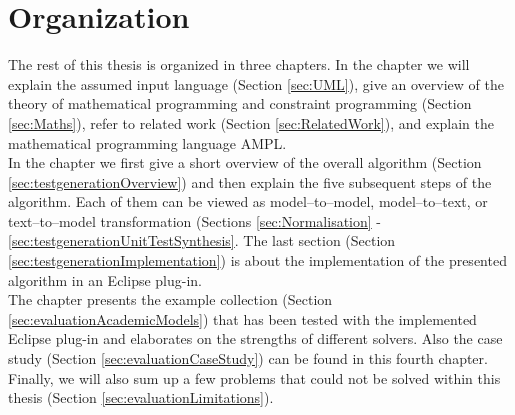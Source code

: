 

\section{Organization}
The rest of this thesis is organized in three chapters. In the chapter  we will explain the assumed input language (Section \ref{sec:UML}), give an overview of the theory of mathematical programming and constraint programming (Section \ref{sec:Maths}), refer to related work (Section \ref{sec:RelatedWork}), and explain the mathematical programming language AMPL.\\
In the chapter  we first give a short overview of the overall algorithm (Section \ref{sec:testgenerationOverview}) and then explain the five subsequent steps of the algorithm. Each of them can be viewed as model--to--model, model--to--text, or text--to--model transformation (Sections \ref{sec:Normalisation} - \ref{sec:testgenerationUnitTestSynthesis}. The last section (Section \ref{sec:testgenerationImplementation}) is about the implementation of the presented algorithm in an Eclipse plug-in.\\
The chapter  presents the example collection (Section \ref{sec:evaluationAcademicModels}) that has been tested with the implemented Eclipse plug-in and elaborates on the strengths of different solvers. Also the case study (Section \ref{sec:evaluationCaseStudy}) can be found in this fourth chapter. Finally, we will also sum up a few problems that could not be solved within this thesis (Section \ref{sec:evaluationLimitations}).